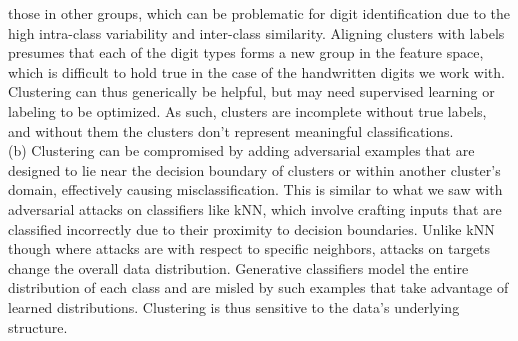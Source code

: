 \documentclass[submit]{harvardml}
\begin{document}
 those in other groups, which can be problematic for digit identification due to the high intra-class variability and inter-class similarity. Aligning clusters with labels presumes that each of the digit types forms a new group in the feature space, which is difficult to hold true in the case of the handwritten digits we work with. Clustering can thus generically be helpful, but may need supervised learning or labeling to be optimized. As such, clusters are incomplete without true labels, and without them the clusters don't represent meaningful classifications. \\
(b)  Clustering can be compromised by adding adversarial examples that are designed to lie near the decision boundary of clusters or within another cluster's domain, effectively causing misclassification. This is similar to what we saw with adversarial attacks on classifiers like kNN, which involve crafting inputs that are classified incorrectly due to their proximity to decision boundaries. Unlike kNN though where attacks are with respect to specific neighbors, attacks on targets change the overall data distribution. Generative classifiers model the entire distribution of each class and are misled by such examples that take advantage of learned distributions. Clustering is thus sensitive to the data's underlying structure. 
















 
\newpage


\newpage
\end{document}

